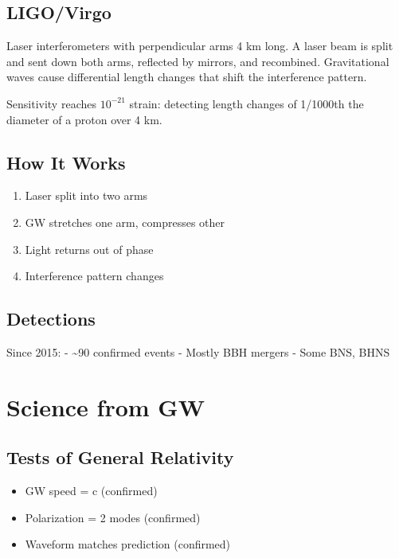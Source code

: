 \documentclass[
  11pt,
  letterpaper,
  twoside,
  openright]{book}
\providecommand{\tightlist}{%
  \setlength{\itemsep}{0pt}\setlength{\parskip}{0pt}}
\begin{document}
\subsection{LIGO/Virgo}\label{ligovirgo}

Laser interferometers with perpendicular arms 4 km long. A laser beam is
split and sent down both arms, reflected by mirrors, and recombined.
Gravitational waves cause differential length changes that shift the
interference pattern.

Sensitivity reaches \(10^{-21}\) strain: detecting length changes of
1/1000th the diameter of a proton over 4 km.

\subsection{How It Works}\label{how-it-works}

\begin{enumerate}
\def\labelenumi{\arabic{enumi}.}
\tightlist
\item
  Laser split into two arms
\item
  GW stretches one arm, compresses other
\item
  Light returns out of phase
\item
  Interference pattern changes
\end{enumerate}

\subsection{Detections}\label{detections}

Since 2015: - \textasciitilde90 confirmed events - Mostly BBH mergers -
Some BNS, BHNS

\section{Science from GW}\label{science-from-gw}

\subsection{Tests of General
Relativity}\label{tests-of-general-relativity}

\begin{itemize}
\tightlist
\item
  GW speed = c (confirmed)
\item
  Polarization = 2 modes (confirmed)
\item
  Waveform matches prediction (confirmed)
\end{itemize}
\end{document}
